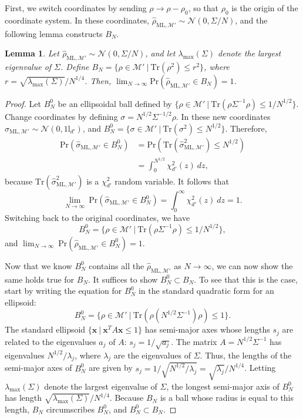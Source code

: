 \documentclass[aps,pra, twocolumn]{revtex4-1}
\newcommand{\M}{\mathcal{M}}
\newcommand{\Id}{\mathbb{I}}
\def\Id{1\!\mathrm{l}}
\newcommand{\rhohat}{\hat{\rho}}
\newcommand{\rhoML}[1]{\rhohat_{\scriptscriptstyle{\mathrm{ML},#1}}}
\newtheorem{lem}{Lemma}
\begin{document}
First, we switch coordinates by sending $\rho \rightarrow \rho - \rho_{0}$, so that $\rho_{0}$ is the origin of the coordinate system. In these coordinates, $\rhoML{\M'} \sim \mathcal{N}(0, \Sigma/N)$, and the following lemma constructs $B_{N}$.

\begin{lem}
\label{eq:lem}
Let $\rhoML{\M'} \sim \mathcal{N}(0, \Sigma/N)$, and let $\lambda_{\max}(\Sigma)$ denote the largest eigenvalue of $\Sigma$. Define $B_{N} = \{\rho \in \M' ~|~\mathrm{Tr}(\rho^{2}) \leq r^{2}\}$, where $r = \sqrt{\lambda_{\max}(\Sigma)}/N^{1/4}$. Then, $\lim_{N \rightarrow \infty} \mathrm{Pr}(\rhoML{\M'} \in B_{N}) =1$.
\end{lem}

\begin{proof}
Let $B^{0}_{N}$ be an ellipsoidal ball defined by $\{\rho \in \M'~|~\mathrm{Tr}(\rho \Sigma^{-1} \rho) \leq 1/N^{1/2}\}$. Change coordinates by defining $\sigma = N^{1/2}\Sigma^{-1/2}\rho$. In these new coordinates $\hat{\sigma}_{\mathrm{ML},\M'} \sim \mathcal{N}(0, \Id_{d'})$, and $B^{0}_{N} = \{\sigma \in \M'~|~\mathrm{Tr}(\sigma^{2}) \leq N^{1/2}\}$. Therefore,
\begin{align*}
\mathrm{Pr}(\hat{\sigma}_{\mathrm{ML},\M'} \in B^{0}_{N}) &= \mathrm{Pr}(\mathrm{Tr}(\hat{\sigma}_{\mathrm{ML},\M'}^{2}) \leq N^{1/2})\\
&= \int_{0}^{N^{1/2}}\chi^{2}_{d'}(z)~dz,
\end{align*}
because $\mathrm{Tr}(\hat{\sigma}_{\mathrm{ML},\M'}^{2})$ is a $\chi^{2}_{d'}$ random variable. It follows that
\[\lim_{N \rightarrow \infty}~\mathrm{Pr}(\hat{\sigma}_{\mathrm{ML},\M'} \in B^{0}_{N})  =\int_{0}^{\infty}\chi^{2}_{d'}(z)~dz =1.\]
Switching back to the original coordinates, we have
\[B^{0}_{N} = \{\rho \in \M'~|~\mathrm{Tr}(\rho \Sigma^{-1} \rho) \leq 1/N^{1/2}\},\]
and $\lim_{N \rightarrow \infty}~\mathrm{Pr}(\rhoML{\M'} \in B^{0}_{N}) = 1$.

Now that we know $B^{0}_{N}$ contains all the $\rhoML{\M'}$ as $N\rightarrow \infty$, we can now show the same holds true for $B_{N}$. It suffices to show $B^{0}_{N} \subset B_{N}$. To see that this is the case, start by writing the equation for $B^{0}_{N}$ in the standard quadratic form for an ellipsoid:
\[B^{0}_{N} = \{\rho \in \M'~|~\mathrm{Tr}(\rho ( N^{1/2}\Sigma^{-1} ) \rho) \leq 1\}.\]
The standard ellipsoid $\{\mathbf{x}~|~\mathbf{x}^{T}A\mathbf{x} \leq 1\}$ has semi-major axes whose lengths $s_{j}$ are related to the eigenvalues $a_{j}$ of $A$: $s_{j} = 1/\sqrt{a_{j}}$. The matrix $A = N^{1/2}\Sigma^{-1}$ has eigenvalues $N^{1/2}/\lambda_{j}$, where $\lambda_{j}$ are the eigenvalues of $\Sigma$. Thus, the lengths of the semi-major axes of $B^{0}_{N}$ are given by $s_{j} = 1/\sqrt{N^{1/2}/\lambda_{j}} = \sqrt{\lambda_{j}}/N^{1/4}$. Letting $\lambda_{\max}(\Sigma)$ denote the largest eigenvalue of $\Sigma$, the longest semi-major axis of $B^{0}_{N}$ has length $\sqrt{\lambda_{\max}(\Sigma)}/N^{1/4}$.
Because $B_{N}$ is a ball whose radius is equal to this length, $B_{N}$ circumscribes $B^{0}_{N}$, and $B^{0}_{N} \subset B_{N}$.


\end{proof}
\end{document}

